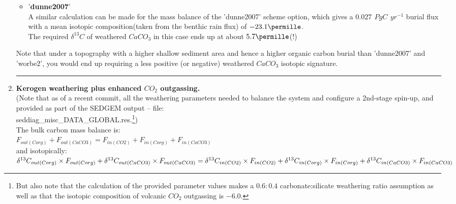 \begin{enumerate}[noitemsep]
\begin{itemize}[noitemsep]
\vspace{1mm}
\item '\textbf{dunne2007}'
\vspace{1mm}
\\A similar calculation can be made for the mass balance of the 'dunne2007' scheme option, which gives a \(0.027\,\ PgC\,\ yr^{-1}\) burial flux with a mean isotopic composition(taken from the benthic rain flux) of \(-23.1\permille\).
\vspace{1mm}
\\The required \(\delta^{13}C\) of weathered \(CaCO_{3}\) in this case ends up at about \(5.7\permille\)(!)

\end{itemize}

\vspace{1mm}
\noindent Note that under a topography with a higher shallow sediment area and hence a higher organic carbon burial than 'dunne2007' and 'worbe2', you would end up requiring a less positive (or negative) weathered \(CaCO_{3}\) isotopic signature. 

\noindent\rule{4cm}{0.5pt}
\vspace{1mm}

\newpage

\item \textbf{Kerogen weathering plus enhanced \(CO_{2}\) outgassing.}
\vspace{1mm}
\\(Note that as of a recent commit, all the weathering parameters needed to balance the system and configure a 2nd-stage spin-up, and provided as part of the \textsf{\footnotesize SEDGEM} output -- file: \\\textsf{\footnotesize seddiag\_misc\_DATA\_GLOBAL.res}.\footnote{But also note that the calculation of the provided  parameter values makes a \(0.6:0.4\) carbonate:silicate weathering ratio assumption as well as that the isotopic composition of volcanic \(CO_{2}\) outgassing is \(-6.0\).})
\vspace{1mm}
\\The bulk carbon mass balance is:
\\\(F_{out(Corg)}+F_{out(CaCO3)}=F_{in(CO2)}+F_{in(Corg)}+F_{in(CaCO3)}\)
\vspace{1mm}
\\and isotopically:
\vspace{1mm}
\\\(\delta^{13}C_{out(Corg)}\times F_{out(Corg)}+\delta^{13}C_{out(CaCO3)}\times F_{out(CaCO3)}=\\ \delta^{13}C_{in(CO2)}\times F_{in(CO2)}+\delta^{13}C_{in(Corg)}\times F_{in(Corg)}+\delta^{13}C_{in(CaCO3)}\times F_{in(CaCO3)}\)


\end{enumerate}
